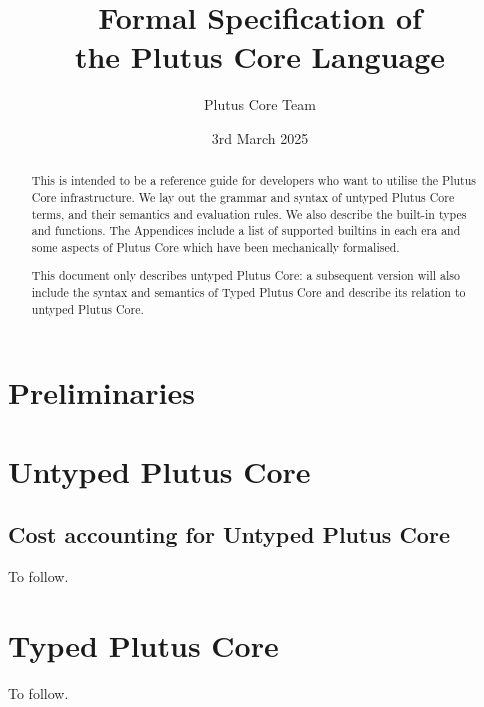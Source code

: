 \documentclass[a4paper]{report}
\title{Formal Specification of\\the Plutus Core Language\\
  \vspace{5mm}
  \LARGE{\red{\textsf{DRAFT}}}
}
\date{3rd March 2025}
\author{Plutus Core Team}
\begin{document}
\maketitle

\begin{abstract}
  This is intended to be a reference guide for developers who want to utilise
  the Plutus Core infrastructure.  We lay out the grammar and syntax of untyped
  Plutus Core terms, and their semantics and evaluation rules.  We also describe
  the built-in types and functions.  The Appendices include a list of supported
  builtins in each era and some aspects of Plutus Core which have been
  mechanically formalised.

  This document only describes untyped Plutus Core: a subsequent version will also
  include the syntax and semantics of Typed Plutus Core and describe its relation to
  untyped Plutus Core.
\end{abstract}

\newpage
\tableofcontents
\newpage



\chapter{Preliminaries}


\chapter{Untyped Plutus Core}



\section{Cost accounting for Untyped Plutus Core}
To follow.
\chapter{Typed Plutus Core}
To follow.

\begin{appendices}



\end{appendices}

\newpage


\newpage
\printnomenclature[2cm]  %
\end{document}
